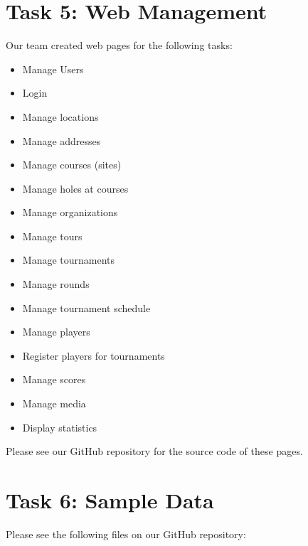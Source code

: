 \documentclass[titlepage]{article}
\begin{document}
\section{Task 5: Web Management}
\vspace{1em}
Our team created web pages for the following tasks:
\vspace{1em}
\begin{itemize}
	\item Manage Users
  \item Login 
  \item Manage locations 
	\item Manage addresses
	\item Manage courses (sites)
	\item Manage holes at courses
	\item Manage organizations 
	\item Manage tours
  \item Manage tournaments 
	\item Manage rounds
  \item Manage tournament schedule
	\item Manage players
	\item Register players for tournaments
	\item Manage scores
	\item Manage media
	\item Display statistics
\end{itemize}

Please see our GitHub repository for the source code of these pages.
\newpage


\section{Task 6: Sample Data}

Please see the following files on our GitHub repository:
\end{document}
